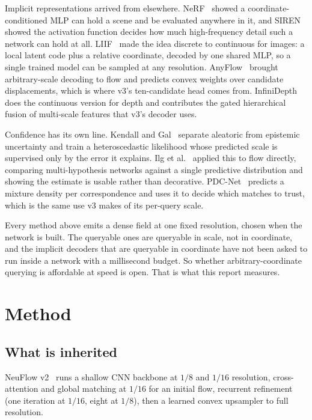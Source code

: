 \documentclass[11pt,a4paper]{article}
\begin{document}
Implicit representations arrived from elsewhere. NeRF~\cite{nerf} showed a
coordinate-conditioned MLP can hold a scene and be evaluated anywhere in it, and
SIREN~\cite{siren} showed the activation function decides how much
high-frequency detail such a network can hold at all. LIIF~\cite{liif} made the
idea discrete to continuous for images: a local latent code plus a relative
coordinate, decoded by one shared MLP, so a single trained model can be sampled
at any resolution. AnyFlow~\cite{anyflow} brought arbitrary-scale decoding to
flow and predicts convex weights over candidate displacements, which is where
v3's ten-candidate head comes from. InfiniDepth~\cite{infinidepth} does the
continuous version for depth and contributes the gated hierarchical fusion of
multi-scale features that v3's decoder uses.

Confidence has its own line. Kendall and Gal~\cite{kendall} separate aleatoric
from epistemic uncertainty and train a heteroscedastic likelihood whose predicted
scale is supervised only by the error it explains. Ilg et al.~\cite{ilg18}
applied this to flow directly, comparing multi-hypothesis networks against a
single predictive distribution and showing the estimate is usable rather than
decorative. PDC-Net~\cite{pdcnet} predicts a mixture density per correspondence
and uses it to decide which matches to trust, which is the same use v3 makes of
its per-query scale.

Every method above emits a dense field at one fixed resolution, chosen when the
network is built. The queryable ones are queryable in scale, not in coordinate,
and the implicit decoders that are queryable in coordinate have not been asked to
run inside a network with a millisecond budget. So whether arbitrary-coordinate
querying is affordable at speed is open. That is what this report measures.

\section{Method}

\subsection{What is inherited}
NeuFlow v2~\cite{neuflow2} runs a shallow CNN
backbone at $1/8$ and $1/16$ resolution, cross-attention and global matching at
$1/16$ for an initial flow, recurrent refinement (one iteration at $1/16$, eight
at $1/8$), then a learned convex upsampler to full resolution.
\end{document}
